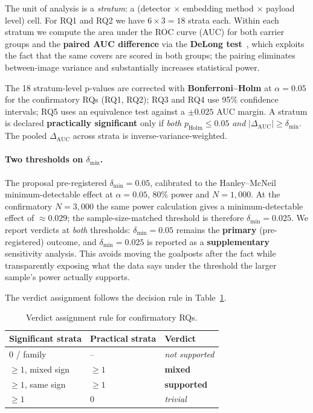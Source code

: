 \documentclass[10pt,twocolumn,a4paper]{article}
\begin{document}
The unit of analysis is a \emph{stratum}: a (detector $\times$ embedding method $\times$ payload level) cell. For RQ1 and RQ2 we have $6\!\times\!3\!=\!18$ strata each. Within each stratum we compute the area under the ROC curve (AUC) for both carrier groups and the \textbf{paired AUC difference} via the \textbf{DeLong test}~\cite{delong1988}, which exploits the fact that the same covers are scored in both groups; the pairing eliminates between-image variance and substantially increases statistical power.

The 18 stratum-level p-values are corrected with \textbf{Bonferroni--Holm} at $\alpha\!=\!0.05$ for the confirmatory RQs (RQ1, RQ2); RQ3 and RQ4 use 95\% confidence intervals; RQ5 uses an equivalence test against a $\pm0.025$ AUC margin. A stratum is declared \textbf{practically significant} only if \emph{both} $p_\text{Holm}\!\leq\!0.05$ \emph{and} $|\Delta_\text{AUC}|\!\geq\!\delta_\text{min}$. The pooled $\Delta_\text{AUC}$ across strata is inverse-variance-weighted.

\paragraph{Two thresholds on $\delta_\text{min}$.} The proposal pre-registered $\delta_\text{min}\!=\!0.05$, calibrated to the Hanley--McNeil minimum-detectable effect at $\alpha\!=\!0.05$, $80\%$ power and $N\!=\!1{,}000$. At the confirmatory $N\!=\!3{,}000$ the same power calculation gives a minimum-detectable effect of $\approx\!0.029$; the sample-size-matched threshold is therefore $\delta_\text{min}\!=\!0.025$. We report verdicts at \emph{both} thresholds: $\delta_\text{min}\!=\!0.05$ remains the \textbf{primary} (pre-registered) outcome, and $\delta_\text{min}\!=\!0.025$ is reported as a \textbf{supplementary} sensitivity analysis. This avoids moving the goalposts after the fact while transparently exposing what the data says under the threshold the larger sample's power actually supports.

The verdict assignment follows the decision rule in Table~\ref{tab:verdictrule}.

\begin{table}[!htbp]
\centering\small
\caption{Verdict assignment rule for confirmatory RQs.}
\label{tab:verdictrule}
\setlength{\tabcolsep}{6pt}\renewcommand{\arraystretch}{1.1}
\begin{tabular}{@{}lll@{}}
\toprule
\textbf{Significant strata} & \textbf{Practical strata} & \textbf{Verdict} \\
\midrule
0 / family            & --             & \emph{not supported} \\
$\geq\!1$, mixed sign & $\geq\!1$      & \textbf{mixed}       \\
$\geq\!1$, same sign  & $\geq\!1$      & \textbf{supported}   \\
$\geq\!1$             & 0              & \emph{trivial}       \\
\bottomrule
\end{tabular}
\end{table}
\end{document}
